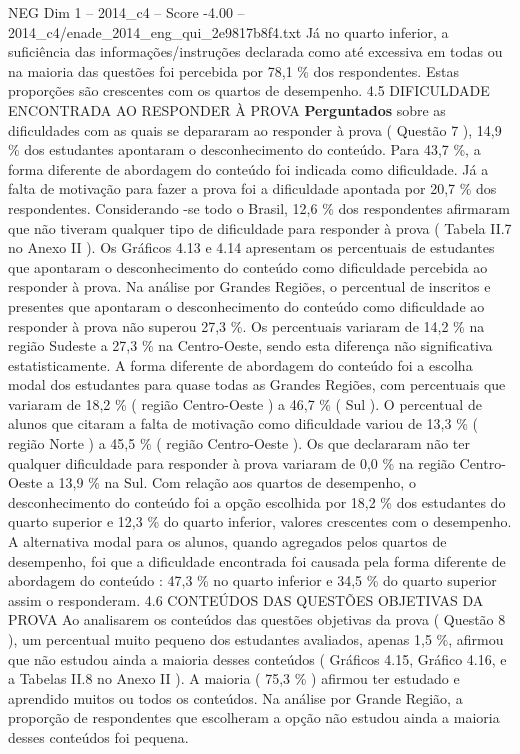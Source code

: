 \begin{textsample}{NEG Dim 1 – 2014\_c4 – Score -4.00 – 2014\_c4/enade\_2014\_eng\_qui\_2e9817b8f4.txt}
Já no quarto inferior, a suficiência das informações/instruções declarada como até excessiva em todas ou na maioria das questões foi percebida por 78,1 \% dos respondentes.
Estas proporções são crescentes com os quartos de desempenho. 4.5 DIFICULDADE ENCONTRADA AO RESPONDER À PROVA \textbf{Perguntados} sobre as dificuldades com as quais se depararam ao responder à prova ( Questão 7 ), 14,9 \% dos estudantes apontaram o desconhecimento do conteúdo.
Para 43,7 \%, a forma diferente de abordagem do conteúdo foi indicada como dificuldade.
Já a falta de motivação para fazer a prova foi a dificuldade apontada por 20,7 \% dos respondentes.
Considerando -se todo o Brasil, 12,6 \% dos respondentes afirmaram que não tiveram qualquer tipo de dificuldade para responder à prova ( Tabela II.7 no Anexo II ).
Os Gráficos 4.13 e 4.14 apresentam os percentuais de estudantes que apontaram o desconhecimento do conteúdo como dificuldade percebida ao responder à prova.
Na análise por Grandes Regiões, o percentual de inscritos e presentes que apontaram o desconhecimento do conteúdo como dificuldade ao responder à prova não superou 27,3 \%.
Os percentuais variaram de 14,2 \% na região Sudeste a 27,3 \% na Centro-Oeste, sendo esta diferença não significativa estatisticamente.
A forma diferente de abordagem do conteúdo foi a escolha modal dos estudantes para quase todas as Grandes Regiões, com percentuais que variaram de 18,2 \% ( região Centro-Oeste ) a 46,7 \% ( Sul ).
O percentual de alunos que citaram a falta de motivação como dificuldade variou de 13,3 \% ( região Norte ) a 45,5 \% ( região Centro-Oeste ).
Os que declararam não ter qualquer dificuldade para responder à prova variaram de 0,0 \% na região Centro-Oeste a 13,9 \% na Sul.
Com relação aos quartos de desempenho, o desconhecimento do conteúdo foi a opção escolhida por 18,2 \% dos estudantes do quarto superior e 12,3 \% do quarto inferior, valores crescentes com o desempenho.
A alternativa modal para os alunos, quando agregados pelos quartos de desempenho, foi que a dificuldade encontrada foi causada pela forma diferente de abordagem do conteúdo : 47,3 \% no quarto inferior e 34,5 \% do quarto superior assim o responderam. 4.6 CONTEÚDOS DAS QUESTÕES OBJETIVAS DA PROVA Ao analisarem os conteúdos das questões objetivas da prova ( Questão 8 ), um percentual muito pequeno dos estudantes avaliados, apenas 1,5 \%, afirmou que não estudou ainda a maioria desses conteúdos ( Gráficos 4.15, Gráfico 4.16, e a Tabelas II.8 no Anexo II ).
A maioria ( 75,3 \% ) afirmou ter estudado e aprendido muitos ou todos os conteúdos.
Na análise por Grande Região, a proporção de respondentes que escolheram a opção não estudou ainda a maioria desses conteúdos foi pequena.

\end{textsample}
